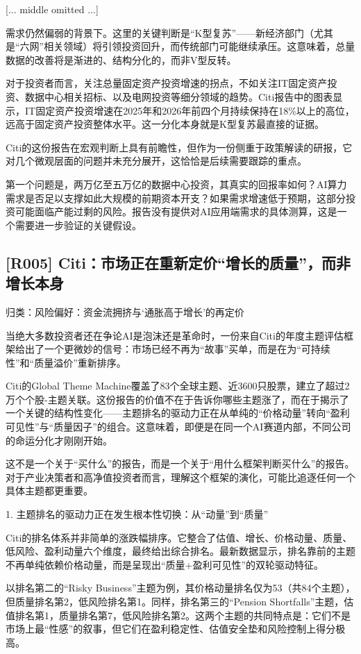 \documentclass[11pt]{ctexart}
\begin{document}
[... middle omitted ...]

需求仍然偏弱的背景下。这里的关键判断是“K型复苏”——新经济部门（尤其是“六网”相关领域）将引领投资回升，而传统部门可能继续承压。这意味着，总量数据的改善将是渐进的、结构分化的，而非V型反转。

对于投资者而言，关注总量固定资产投资增速的拐点，不如关注IT固定资产投资、数据中心相关招标、以及电网投资等细分领域的趋势。Citi报告中的图表显示，IT固定资产投资增速在2025年和2026年前四个月持续保持在18\%以上的高位，远高于固定资产投资整体水平。这一分化本身就是K型复苏最直接的证据。

Citi的这份报告在宏观判断上具有前瞻性，但作为一份侧重于政策解读的研报，它对几个微观层面的问题并未充分展开，这恰恰是后续需要跟踪的重点。

第一个问题是，两万亿至五万亿的数据中心投资，其真实的回报率如何？AI算力需求是否足以支撑如此大规模的前期资本开支？如果需求增速低于预期，这部分投资可能面临产能过剩的风险。报告没有提供对AI应用端需求的具体测算，这是一个需要进一步验证的关键假设。

\subsection{[R005] Citi：市场正在重新定价“增长的质量”，而非增长本身}
{\small\color{refgray}归类：风险偏好：资金流拥挤与‘通胀高于增长’的再定价}

当绝大多数投资者还在争论AI是泡沫还是革命时，一份来自Citi的年度主题评估框架给出了一个更微妙的信号：市场已经不再为“故事”买单，而是在为“可持续性”和“质量溢价”重新排序。

Citi的Global Theme Machine覆盖了83个全球主题、近3600只股票，建立了超过2万个个股-主题关联。这份报告的价值不在于告诉你哪些主题涨了，而在于揭示了一个关键的结构性变化——主题排名的驱动力正在从单纯的“价格动量”转向“盈利可见性”与“质量因子”的组合。这意味着，即便是在同一个AI赛道内部，不同公司的命运分化才刚刚开始。

这不是一个关于“买什么”的报告，而是一个关于“用什么框架判断买什么”的报告。对于产业决策者和高净值投资者而言，理解这个框架的演化，可能比追逐任何一个具体主题都更重要。

1. 主题排名的驱动力正在发生根本性切换：从“动量”到“质量”

Citi的排名体系并非简单的涨跌幅排序。它整合了估值、增长、价格动量、质量、低风险、盈利动量六个维度，最终给出综合排名。最新数据显示，排名靠前的主题不再单纯依赖价格动量，而是呈现出“质量+盈利可见性”的双轮驱动特征。

以排名第二的“Risky Business”主题为例，其价格动量排名仅为53（共84个主题），但质量排名第2，低风险排名第1。同样，排名第三的“Pension Shortfalls”主题，估值排名第1，质量排名第7，低风险排名第2。这两个主题的共同特点是：它们不是市场上最“性感”的叙事，但它们在盈利稳定性、估值安全垫和风险控制上得分极高。
\end{document}
